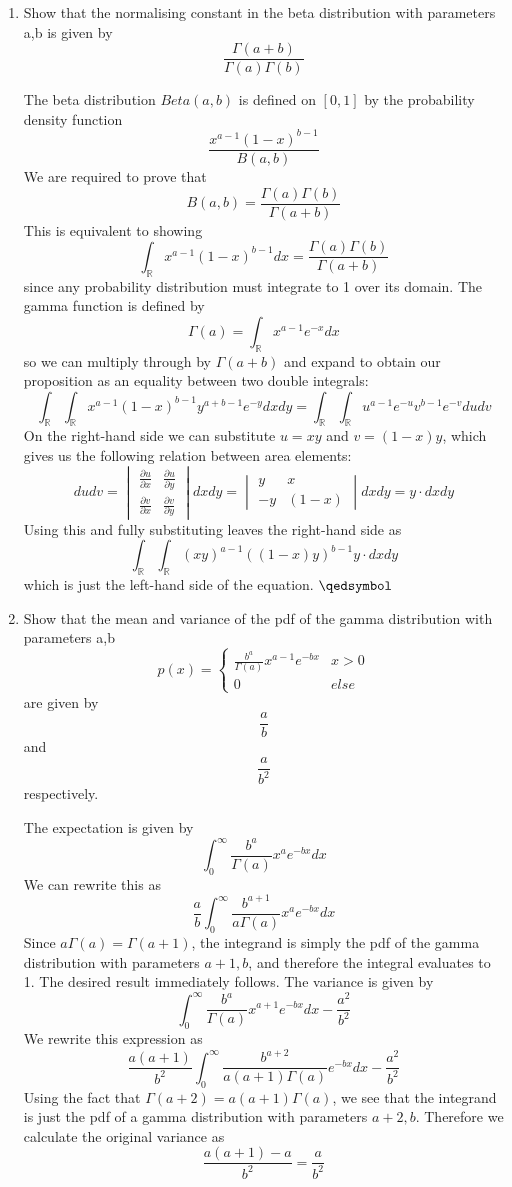 \documentclass{article}
\newcommand{\chapternumber}{2}
\newenvironment{QandA}{\begin{enumerate}[label=\chapternumber.\arabic*]\bfseries\boldmath}
	{\end{enumerate}}
\newenvironment{answered}{\par\bigskip\normalfont\unboldmath}{}
\begin{document}
\begin{QandA}
		\item Show that the normalising constant in the beta distribution with parameters a,b is given by 
		\[\frac{\Gamma(a+b)}{\Gamma(a)\Gamma(b)}\]
		\begin{answered}
			The beta distribution $Beta(a,b)$ is defined on $[0,1]$ by the probability density function
			\[\frac{x^{a-1}(1-x)^{b-1}}{B(a,b)}\]
			We are required to prove that 
			\[B(a,b)=\frac{\Gamma(a)\Gamma(b)}{\Gamma(a+b)}\]
			This is equivalent to showing
			\[\int_\mathbb{R}x^{a-1}(1-x)^{b-1}dx=\frac{\Gamma(a)\Gamma(b)}{\Gamma(a+b)}\]
			since any probability distribution must integrate to 1 over its domain.
			The gamma function is defined by
			\[\Gamma(a)=\int_\mathbb{R}x^{a-1}e^{-x}dx\]
			so we can multiply through by $\Gamma(a+b)$ and expand to obtain our proposition as an equality between two double integrals:
			\[\int_\mathbb{R}\int_\mathbb{R}x^{a-1}(1-x)^{b-1}y^{a+b-1}e^{-y}dxdy=\int_\mathbb{R}\int_\mathbb{R}u^{a-1}e^{-u}v^{b-1}e^{-v}dudv\]
			On the right-hand side we can substitute $u=xy$ and $v=(1-x)y$, which gives us the following relation between area elements:
			\[dudv=\begin{vmatrix}
			\frac{\partial u}{\partial x} & \frac{\partial u}{\partial y}\\
			\frac{\partial v}{\partial x} & \frac{\partial v}{\partial y}
			\end{vmatrix}dxdy = 
			\begin{vmatrix}
			y & x\\
			-y & (1-x)
			\end{vmatrix}dxdy
			=y\cdot dxdy
			\]
			Using this and fully substituting leaves the right-hand side as
			\[\int_\mathbb{R}\int_\mathbb{R}(xy)^{a-1}((1-x)y)^{b-1}y\cdot dxdy\]
			which is just the left-hand side of the equation. $\qedsymbol$
		\end{answered}
	
	\item Show that the mean and variance of the pdf of the gamma distribution with parameters a,b 
	\[p(x)=\begin{cases}
	\frac{b^a}{\Gamma(a)}x^{a-1}e^{-bx} & x>0\\
	0 & else
	\end{cases}\]
	are given by
	\[\frac{a}{b}\]
	and
	\[\frac{a}{b^2}\]
	respectively.
	\begin{answered}
		The expectation is given by 
		\[\int_0^{\infty} \frac{b^a}{\Gamma(a)}x^ae^{-bx}dx\]
		We can rewrite this as
		\[\frac{a}{b}\int_0^{\infty}\frac{b^{a+1}}{a\Gamma(a)}x^a e^{-bx}dx\]
		Since $a\Gamma(a)=\Gamma(a+1)$, the integrand is simply the pdf of the gamma distribution with parameters $a+1,b$, and therefore the integral evaluates to 1. The desired result immediately follows.
		The variance is given by
		\[\int_0^{\infty} \frac{b^a}{\Gamma(a)}x^{a+1}e^{-bx}dx-\frac{a^2}{b^2}\]
		We rewrite this expression as 
		\[\frac{a(a+1)}{b^2}\int_0^{\infty}\frac{b^{a+2}}{a(a+1)\Gamma(a)}e^{-bx}dx-\frac{a^2}{b^2}\] Using the fact that $\Gamma(a+2)=a(a+1)\Gamma(a)$, we see that the integrand is just the pdf of a gamma distribution with parameters $a+2,b$. Therefore we calculate the original variance as 
		\[\frac{a(a+1)-a}{b^2}=\frac{a}{b^2}\]
	\end{answered}


\end{QandA}
\end{document}
